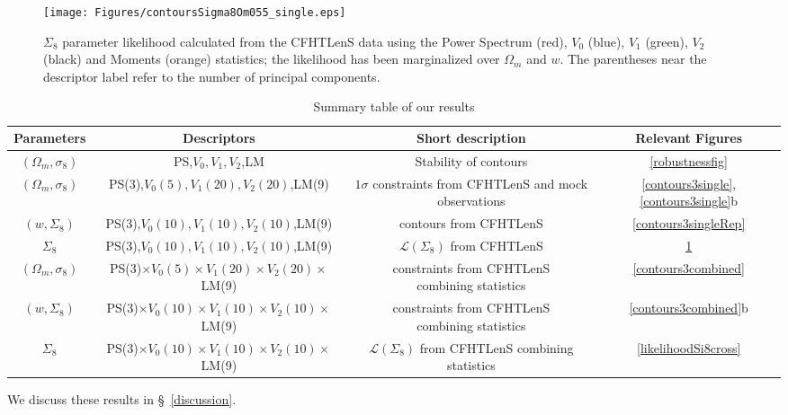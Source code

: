\documentclass[reprint,aps,prd,superscriptaddress,showkeys,showpacs]{revtex4-1}
\begin{document}
\begin{figure}
\begin{center}
\texttt{[image: Figures/contoursSigma8Om055\_single.eps]}
\end{center}
\caption{$\Sigma_8$ parameter likelihood calculated from the CFHTLenS data using the Power Spectrum (red), $V_0$ (blue), $V_1$ (green), $V_2$ (black) and Moments (orange) statistics; the likelihood has been marginalized over $\Omega_m$ and $w$. The parentheses near the descriptor label refer to the number of principal components.}
\label{likelihoodSi8single}
\end{figure}

\begin{table*}
\begin{tabular}{c|c|c||c}
Parameters & Descriptors & Short description & Relevant Figures \\ \hline \hline
$(\Omega_m,\sigma_8)$ & PS,$V_0,V_1,V_2$,LM & Stability of contours & \ref{robustnessfig} \\ \hline 
$(\Omega_m,\sigma_8)$ & PS(3),$V_0(5),V_1(20),V_2(20)$,LM(9) &\pbox{20cm}{$1\sigma$ constraints from CFHTLenS \\ and mock observations}  & \ref{contours3single},\ref{contours3single}b \\ \hline
$(w,\Sigma_8)$ & PS(3),$V_0(10),V_1(10),V_2(10)$,LM(9) & contours from CFHTLenS & \ref{contours3singleRep} \\ \hline 
$\Sigma_8$ & PS(3),$V_0(10),V_1(10),V_2(10)$,LM(9) & $\mathcal{L}(\Sigma_8)$ from CFHTLenS & \ref{likelihoodSi8single} \\ \hline
$(\Omega_m,\sigma_8)$ & PS(3)$\times V_0(5)\times V_1(20)\times V_2(20)\times$LM(9) & \pbox{20cm}{constraints from CFHTLenS \\ combining statistics} & \ref{contours3combined} \\ \hline
$(w,\Sigma_8)$ & PS(3)$\times V_0(10)\times V_1(10)\times V_2(10)\times$LM(9) & \pbox{20cm}{constraints from CFHTLenS \\ combining statistics} & \ref{contours3combined}b \\ \hline 
$\Sigma_8$ & PS(3)$\times V_0(10)\times V_1(10)\times V_2(10)\times$LM(9) & \pbox{20cm}{$\mathcal{L}(\Sigma_8)$ from CFHTLenS \\ combining statistics} & \ref{likelihoodSi8cross} \\ \hline
\end{tabular}
\caption{Summary table of our results}
\label{summarytable}
\end{table*}
%
We discuss these results in \S~\ref{discussion}. 
\end{document}
